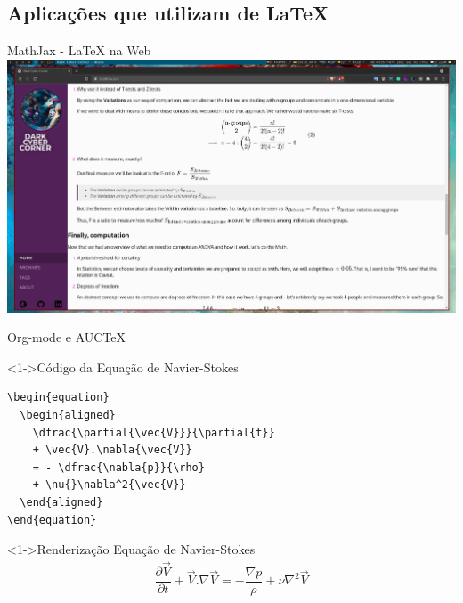\documentclass[bigger]{beamer}
\begin{document}
{\subsection{Aplicações que utilizam de \LaTeX{}}
\label{sec:orgaa3785f}
\begin{frame}[label={sec:org0584a86}]{MathJax - \LaTeX{} na Web}
\transdissolve
\href{img/mathjax.png}{\includegraphics[center,width=1.02\textwidth]{./img/mathjax.png}}
\end{frame}

\begin{frame}[label={sec:org2b92051},fragile]{Org-mode e AUCTeX}
 \begin{block}<1->{Código da Equação de Navier-Stokes}
\begin{verbatim}
\begin{equation}
  \begin{aligned}
    \dfrac{\partial{\vec{V}}}{\partial{t}}
    + \vec{V}.\nabla{\vec{V}}
    = - \dfrac{\nabla{p}}{\rho}
    + \nu{}\nabla^2{\vec{V}}
  \end{aligned}
\end{equation}
\end{verbatim}

\transdissolve
\pause
\end{block}

\begin{block}<1->{Renderização Equação de Navier-Stokes}
\begin{equation}
        \begin{aligned}
        \dfrac{\partial{\vec{V}}}{\partial{t}} + \vec{V}.\nabla{\vec{V}} = - \dfrac{\nabla{p}}{\rho} + \nu{}\nabla^2{\vec{V}}
        \end{aligned}
\end{equation}
\end{block}
\end{frame}

}
\end{document}
